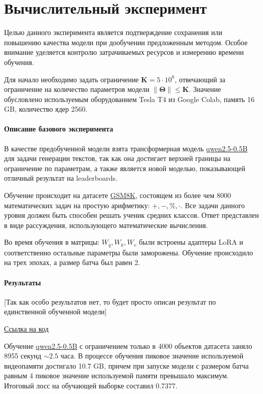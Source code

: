 \documentclass[12pt, twoside]{article}
\newcommand{\bTheta}{\boldsymbol{\Theta}}
\begin{document}
\vspace{10}

\section{Вычислительный эксперимент}

Целью данного эксперимента является подтверждение сохранения или повышению качества модели при дообучении предложенным методом. Особое внимание уделяется контролю затрачиваемых ресурсов и измерению времени обучения.

Для начало необходимо задать ограничение $\mathbf{K} = 5\cdot10^8$, отвечающий за ограничение на количество параметров модели $\| \bTheta\| \le \mathbf{K}$. Значение обусловлено используемым оборудованием Tesla T4 из Google Colab, память 16 GB, количество ядер 2560. 

\paragraph{Описание базового эксперимента}
В качестве предобученной модели взята трансформерная модель \href{https://huggingface.co/Qwen/Qwen2.5-0.5B}{qwen2.5-0.5B} для задачи генерации текстов, так как она достигает верхней границы на ограничение по параметрам, а также является новой моделью, показывающей отличный результат на leaderboards.

Обучение происходит на датасете \href{https://huggingface.co/datasets/openai/gsm8k}{GSM8K}, состоящем из более чем 8000 математических задач на простую арифметику: $+, -, \%, \cdot$. Все задачи данного уровня должен быть способен решать ученик средних классов. Ответ представлен в виде рассуждения, использующего математические вычисления.

Во время обучения в матрицы:  $W_q, W_k, W_v$ были встроены адаптеры LoRA и соответственно остальные параметры были заморожены. Обучение происходило на трех эпохах, а размер батча был равен 2.

\paragraph{Результаты}

[Так как особо результатов нет, то будет просто описан результат по единственной обученной модели]

\href{https://github.com/MuQlanyu/2025-Project-178/blob/main/notebooks/reports/report_20.03.ipynb}{Ссылка на код}

Обучение \href{https://huggingface.co/Qwen/Qwen2.5-0.5B}{qwen2.5-0.5B} с ограничением только в 4000 объектов датасета заняло 8955 секунд $\sim 2.5$ часа. В процессе обучения пиковое значение используемой видеопамяти достигало 10.7 GB, причем при запуске модели с размером батча равным 4 пиковое значение используемой памяти превышало максимум. Итоговый лосс на обучающей выборке составил 0.7377.
\end{document}
